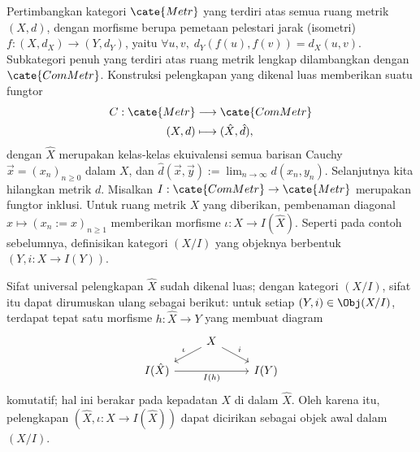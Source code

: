 \begin{example}\label{eg:metric-completion}
	Pertimbangkan kategori $\cate{Metr}$ yang terdiri atas semua ruang metrik $(X, d)$, dengan morfisme berupa pemetaan pelestari jarak (isometri) $f: (X, d_X) \to (Y, d_Y)$, yaitu $\forall u,v, \; d_Y(f(u), f(v))=d_X(u,v)$. Subkategori penuh yang terdiri atas ruang metrik lengkap dilambangkan dengan $\cate{ComMetr}$. Konstruksi pelengkapan yang dikenal luas \cite[\S 8.1]{Xiong} memberikan suatu fungtor
	\begin{align*}
		C: \cate{Metr} & \longrightarrow \cate{ComMetr} \\
		(X, d) & \longmapsto (\hat{X}, \hat{d}),
	\end{align*}
	dengan $\hat{X}$ merupakan kelas-kelas ekuivalensi semua barisan Cauchy $\vec{x} = (x_n)_{n \geq 0}$ dalam $X$, dan $\hat{d}(\vec{x}, \vec{y}) := \displaystyle\lim_{n \to \infty} d(x_n, y_n)$. Selanjutnya kita hilangkan metrik $d$. Misalkan $I: \cate{ComMetr} \to \cate{Metr}$ merupakan fungtor inklusi. Untuk ruang metrik $X$ yang diberikan, pembenaman diagonal $x \mapsto \left( x_n := x \right)_{n \geq 1}$ memberikan morfisme $\iota: X \to I(\hat{X})$. Seperti pada contoh sebelumnya, definisikan kategori $(X / I)$ yang objeknya berbentuk $(Y, i: X \to I(Y))$.

	Sifat universal pelengkapan $\hat{X}$ sudah dikenal luas; dengan kategori $(X / I)$, sifat itu dapat dirumuskan ulang sebagai berikut: untuk setiap $(Y, i) \in \Obj(X / I)$, terdapat tepat satu morfisme $h: \hat{X} \to Y$ yang membuat diagram
	\[\begin{tikzcd}[row sep=small]
		{} & X \arrow[ld, "\iota"'] \arrow[rd, "i"] & \\
		I(\hat{X}) \arrow[rr, "I(h)"'] & & I(Y)
	\end{tikzcd}\]
	komutatif; hal ini berakar pada kepadatan $X$ di dalam $\hat{X}$. Oleh karena itu, pelengkapan $(\hat{X}, \iota: X \to I(\hat{X}))$ dapat dicirikan sebagai objek awal dalam $(X / I)$.
\end{example}

